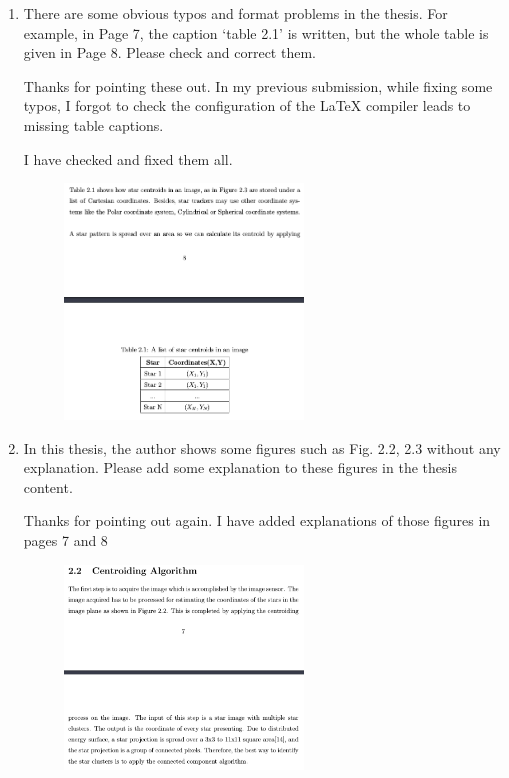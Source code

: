 \documentclass[dvips,a4paper,12pt]{report}
\begin{document}
\begin{enumerate}
    \color{blue}
    \item There are some obvious typos and format problems in the thesis. For example, in Page 7, the caption ‘table 2.1’ is written, but the whole table is given in Page 8. Please check and correct them.

    \color{black}
    Thanks for pointing these out. In my previous submission, while fixing some typos, I forgot to check the configuration of the LaTeX compiler leads to missing table captions.

    I have checked and fixed them all. \\

    \begin{figure}[H]
        \centering
        \includegraphics[width=0.6\textwidth]{1}
    \end{figure}

    \color{blue}
    \item In this thesis, the author shows some figures such as Fig. 2.2, 2.3 without any explanation. Please add some explanation to these figures in the thesis content.

    \color{black}
    Thanks for pointing out again. I have added explanations of those figures in pages 7 and 8
    
    \begin{figure}[H]
        \centering
        \includegraphics[width=0.6\textwidth]{2}
    \end{figure}


\end{enumerate}
\end{document}
